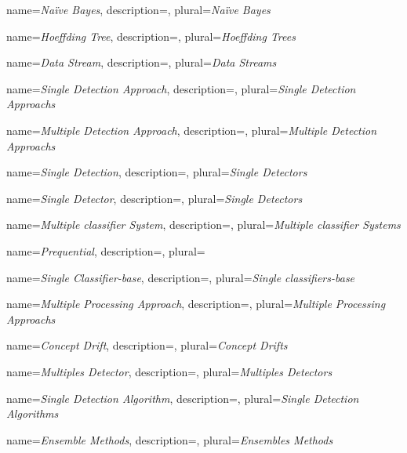 



{
  name=\textit{Na{\"i}ve Bayes},
  description={},
  plural=\textit{Na{\"i}ve Bayes}
}

{
  name=\textit{Hoeffding Tree},
  description={},
  plural=\textit{Hoeffding Trees}
}




{
  name=\textit{Data Stream},
  description={},
  plural=\textit{Data Streams}
}


{
  name=\textit{Single Detection Approach},
  description={},
  plural=\textit{Single Detection Approachs}
}



{
  name=\textit{Multiple Detection Approach},
  description={},
  plural=\textit{Multiple Detection Approachs}
}

{
  name=\textit{Single Detection},
  description={},
  plural=\textit{Single Detectors}
}


{
  name=\textit{Single Detector},
  description={},
  plural=\textit{Single Detectors}
}



{
  name=\textit{Multiple classifier System},
  description={},
  plural=\textit{Multiple classifier Systems}
}
 

{
  name=\textit{Prequential},
  description={},
  plural=\textit{}
}


{
  name=\textit{Single Classifier-base},
  description={},
  plural=\textit{Single classifiers-base}
}

{
  name=\textit{Multiple Processing Approach},
  description={},
  plural=\textit{Multiple Processing Approachs}
}

{
  name=\textit{Concept Drift},
  description={},
  plural=\textit{Concept Drifts}
}


{
  name=\textit{Multiples Detector},
  description={},
  plural=\textit{Multiples Detectors}
}

{
  name=\textit{Single Detection Algorithm},
  description={},
  plural=\textit{Single Detection Algorithms}
}

{
  name=\textit{Ensemble Methods},
  description={},
  plural=\textit{Ensembles Methods}
}










